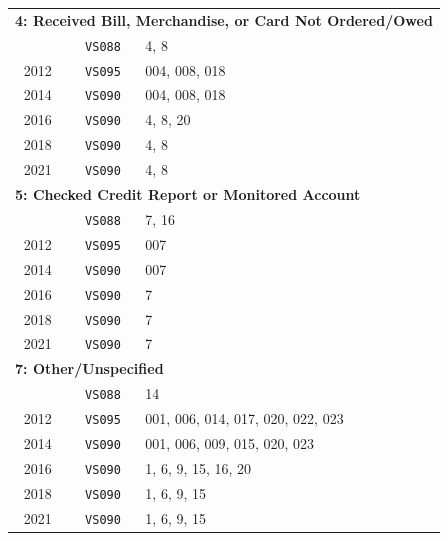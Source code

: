 \begin{longtable}{c c p{7.5cm}}
\multicolumn{3}{l}{\textbf{4: Received Bill, Merchandise, or Card Not Ordered/Owed}} \\ \addlinespace
2008 & \texttt{VS088} & 4, 8 \\
2012 & \texttt{VS095} & 004, 008, 018 \\
2014 & \texttt{VS090} & 004, 008, 018 \\
2016 & \texttt{VS090} & 4, 8, 20 \\
2018 & \texttt{VS090} & 4, 8 \\
2021 & \texttt{VS090} & 4, 8 \\
\midrule

\multicolumn{3}{l}{\textbf{5: Checked Credit Report or Monitored Account}} \\ \addlinespace
2008 & \texttt{VS088} & 7, 16 \\
2012 & \texttt{VS095} & 007 \\
2014 & \texttt{VS090} & 007 \\
2016 & \texttt{VS090} & 7 \\
2018 & \texttt{VS090} & 7 \\
2021 & \texttt{VS090} & 7 \\
\midrule

\multicolumn{3}{l}{\textbf{7: Other/Unspecified}} \\ \addlinespace
2008 & \texttt{VS088} & 14 \\
2012 & \texttt{VS095} & 001, 006, 014, 017, 020, 022, 023 \\
2014 & \texttt{VS090} & 001, 006, 009, 015, 020, 023 \\
2016 & \texttt{VS090} & 1, 6, 9, 15, 16, 20 \\
2018 & \texttt{VS090} & 1, 6, 9, 15 \\
2021 & \texttt{VS090} & 1, 6, 9, 15 \\

\end{longtable}

